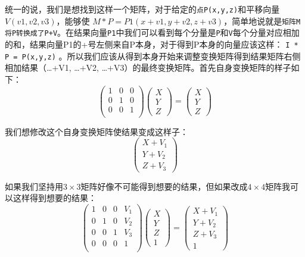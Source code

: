 \documentclass[UTF8,a4paper,8pt]{ctexbook}
\begin{document}
		统一的说，我们是想找到这样一个矩阵，对于给定的\verb|点P(x,y,z)|和平移向量$V(v1,v2,v3)$，能够使 $M * P = P1(x+v1, y+v2, z+v3) $，简单地说就是\verb|矩阵M将P转换成了P+V|。在结果向量\verb|P1|中我们可以看到每个分量是\verb|P|和\verb|V|每个分量对应相加的和，结果向量P1的+号左侧来自P本身，对于得到P本身的向量应该这样： 
		\verb|I * P = P(x,y,z)| 。所以我们应该从得到本身开始来调整变换矩阵得到结果矩阵右侧相加结果（…+V1, …+V2, …+V3）的最终变换矩阵。首先自身变换矩阵的样子如下：
			\begin{equation}
			 \left(
			\begin{array}{ccc}
			1 & 0 & 0\\
			
			0 & 1 & 0\\
			
			0 & 0 & 1\\
			\end{array}
			\right)
			\left(
			\begin{array}{c}
				X\\ 
				Y\\
				Z 
			\end{array}	
			\right) 
			=
			\left(
				\begin{array}{c}
				X\\ 
				Y\\
				Z 
				\end{array}	
			\right)
		\end{equation}
		
		我们想修改这个自身变换矩阵使结果变成这样子：
			$$
				\left(
				\begin{array}{c}
				X+V_1\\ 
				Y+V_2\\
				Z+V_3 
				\end{array}	
				\right)
			$$
		
		如果我们坚持用$3\times3$矩阵好像不可能得到想要的结果，但如果改成$4\times4$矩阵我可以这样得到想要的结果：
			\begin{equation}
			\left(
			\begin{array}{cccc}
			1 & 0 & 0& V_1\\
			
			0 & 1 & 0& V_2\\
			
			0 & 0 & 1& V_3\\
			
			0 & 0 & 0& 1\\
			\end{array}
			\right)
			\left(
			\begin{array}{c}
			X\\ 
			Y\\
			Z\\
			1 
			\end{array}	
			\right) 
			=
			\left(
			\begin{array}{c}
			X+V_1\\ 
			Y+V_2\\
			Z+V_3\\
			1 
			\end{array}	
			\right)
			\end{equation}
		
\end{document}

